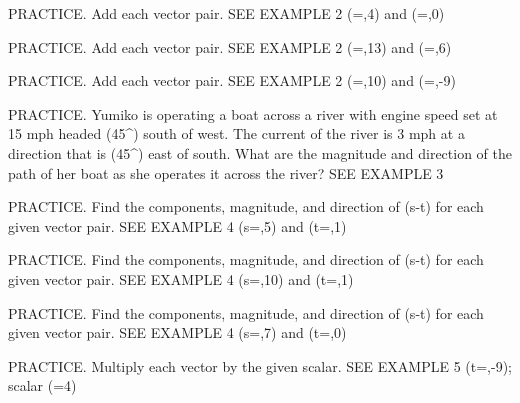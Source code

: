 \documentclass{article}
\newenvironment{practice}[2]{}{}        %
\newcommand{\answer}[1]{}               %
\begin{document}
\begin{practice}{21}{1}
PRACTICE. Add each vector pair. SEE EXAMPLE 2
(=,4\rangle) and (=,0\rangle)
\answer{(\langle7,4\rangle)}
\end{practice}
\begin{practice}{22}{1}
PRACTICE. Add each vector pair. SEE EXAMPLE 2
(=,13\rangle) and (=,6\rangle)
\answer{(\langle-8,19\rangle)}
\end{practice}
\begin{practice}{23}{1}
PRACTICE. Add each vector pair. SEE EXAMPLE 2
(=,10\rangle) and (=,-9\rangle)
\answer{(\langle7,1\rangle)}
\end{practice}
\begin{practice}{24}{1}
PRACTICE. Yumiko is operating a boat across a river with engine speed set at 15 mph headed (45^\circ) south of west. The current of the river is 3 mph at a direction that is (45^\circ) east of south. What are the magnitude and direction of the path of her boat as she operates it across the river? SEE EXAMPLE 3
\answer{The magnitude of her boat is about 15.3 mph in the direction of about (236.2^\circ).}
\end{practice}
\begin{practice}{25}{1}
PRACTICE. Find the components, magnitude, and direction of (\vec s-\vec t) for each given vector pair. SEE EXAMPLE 4
(\vec s=,5\rangle) and (\vec t=,1\rangle)
\answer{(\langle14,4\rangle); magnitude (\approx14.6); direction (\approx16.0^\circ)}
\end{practice}
\begin{practice}{26}{1}
PRACTICE. Find the components, magnitude, and direction of (\vec s-\vec t) for each given vector pair. SEE EXAMPLE 4
(\vec s=,10\rangle) and (\vec t=,1\rangle)
\answer{(\langle-2,9\rangle); magnitude (\approx9.2); direction (\approx102.5^\circ)}
\end{practice}
\begin{practice}{27}{1}
PRACTICE. Find the components, magnitude, and direction of (\vec s-\vec t) for each given vector pair. SEE EXAMPLE 4
(\vec s=,7\rangle) and (\vec t=,0\rangle)
\answer{(\langle-3,7\rangle); magnitude (\approx7.6); direction (\approx113.2^\circ)}
\end{practice}
\begin{practice}{28}{1}
PRACTICE. Multiply each vector by the given scalar. SEE EXAMPLE 5
(\vec t=,-9\rangle); scalar (=4)
\answer{(\langle-28,-36\rangle)}
\end{practice}
\end{document}
